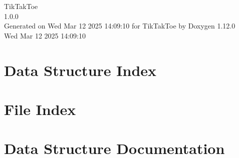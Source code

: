 \documentclass[twoside]{book}
\newcommand{\+}{\discretionary{\mbox{\scriptsize$\hookleftarrow$}}{}{}}
\newcommand{\clearemptydoublepage}{%
    \newpage{\pagestyle{empty}\cleardoublepage}%
  }
\begin{document}
  \raggedbottom
    \hypersetup{pageanchor=false,
                bookmarksnumbered=true,
                pdfencoding=unicode
               }
  \begin{titlepage}
  \vspace*{7cm}
  \begin{center}%
  {\Large Tik\+Tak\+Toe}\\
  [1ex]\large 1.\+0.\+0 \\
  \vspace*{1cm}
  {\large Generated on Wed Mar 12 2025 14\+:09\+:10 for Tik\+Tak\+Toe by Doxygen 1.12.0}\\
    \vspace*{0.5cm}
    {\small Wed Mar 12 2025 14:09:10}
  \end{center}
  \end{titlepage}
  \clearemptydoublepage
  \tableofcontents
  \clearemptydoublepage
  \hypersetup{pageanchor=true}



\chapter{Data Structure Index}

\chapter{File Index}

\chapter{Data Structure Documentation}







\end{document}

